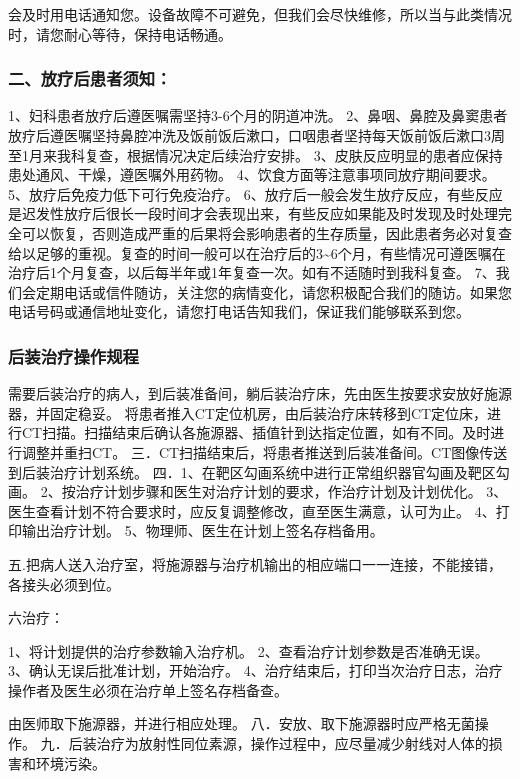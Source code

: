 会及时用电话通知您。设备故障不可避免，但我们会尽快维修，所以当与此类情况时，请您耐心等待，保持电话畅通。

\subsubsection{二、放疗后患者须知：}

1、妇科患者放疗后遵医嘱需坚持3-6个月的阴道冲洗。
2、鼻咽、鼻腔及鼻窦患者放疗后遵医嘱坚持鼻腔冲洗及饭前饭后漱口，口咽患者坚持每天饭前饭后漱口3周至1月来我科复查，根据情况决定后续治疗安排。
3、皮肤反应明显的患者应保持患处通风、干燥，遵医嘱外用药物。
4、饮食方面等注意事项同放疗期间要求。
5、放疗后免疫力低下可行免疫治疗。
6、放疗后一般会发生放疗反应，有些反应是迟发性放疗后很长一段时间才会表现出来，有些反应如果能及时发现及时处理完全可以恢复，否则造成严重的后果将会影响患者的生存质量，因此患者务必对复查给以足够的重视。复查的时间一般可以在治疗后的3\textasciitilde{}6个月，有些情况可遵医嘱在治疗后1个月复查，以后每半年或1年复查一次。如有不适随时到我科复查。
7、我们会定期电话或信件随访，关注您的病情变化，请您积极配合我们的随访。如果您电话号码或通信地址变化，请您打电话告知我们，保证我们能够联系到您。

\subsubsection{后装治疗操作规程}

需要后装治疗的病人，到后装准备间，躺后装治疗床，先由医生按要求安放好施源器，并固定稳妥。
将患者推入CT定位机房，由后装治疗床转移到CT定位床，进行CT扫描。扫描结束后确认各施源器、插值针到达指定位置，如有不同。及时进行调整并重扫CT。
三．CT扫描结束后，将患者推送到后装准备间。CT图像传送到后装治疗计划系统。
四．1、在靶区勾画系统中进行正常组织器官勾画及靶区勾画。
2、按治疗计划步骤和医生对治疗计划的要求，作治疗计划及计划优化。
3、医生查看计划不符合要求时，应反复调整修改，直至医生满意，认可为止。
4、打印输出治疗计划。
5、物理师、医生在计划上签名存档备用。

五.把病人送入治疗室，将施源器与治疗机输出的相应端口一一连接，不能接错，各接头必须到位。

六治疗：

1、将计划提供的治疗参数输入治疗机。
2、查看治疗计划参数是否准确无误。
3、确认无误后批准计划，开始治疗。
4、治疗结束后，打印当次治疗日志，治疗操作者及医生必须在治疗单上签名存档备查。

由医师取下施源器，并进行相应处理。
八．安放、取下施源器时应严格无菌操作。
九．后装治疗为放射性同位素源，操作过程中，应尽量减少射线对人体的损害和环境污染。

